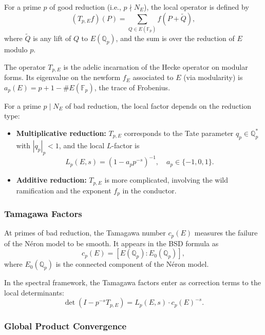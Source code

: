 \begin{definition}\label{def:local-factor-good}
For a prime $p$ of good reduction (i.e., $p \nmid N_E$), the local operator is defined by
\[
(T_{p,E} f)(P) = \sum_{Q \in E(\mathbb{F}_p)} f(P + \widetilde{Q}),
\]
where $\widetilde{Q}$ is any lift of $Q$ to $E(\mathbb{Q}_p)$, and the sum is over the reduction of $E$ modulo $p$.
\end{definition}

\begin{remark}
The operator $T_{p,E}$ is the adelic incarnation of the Hecke operator on modular forms. Its eigenvalue on the newform $f_E$ associated to $E$ (via modularity) is $a_p(E) = p + 1 - \#E(\mathbb{F}_p)$, the trace of Frobenius.
\end{remark}

\begin{definition}\label{def:local-factor-bad}
For a prime $p \mid N_E$ of bad reduction, the local factor depends on the reduction type:
\begin{itemize}
\item \textbf{Multiplicative reduction:} $T_{p,E}$ corresponds to the Tate parameter $q_p \in \mathbb{Q}_p^*$ with $|q_p|_p < 1$, and the local $L$-factor is
\[
L_p(E, s) = (1 - a_p p^{-s})^{-1}, \quad a_p \in \{-1, 0, 1\}.
\]
\item \textbf{Additive reduction:} $T_{p,E}$ is more complicated, involving the wild ramification and the exponent $f_p$ in the conductor.
\end{itemize}
\end{definition}

\subsubsection{Tamagawa Factors}

At primes of bad reduction, the Tamagawa number $c_p(E)$ measures the failure of the Néron model to be smooth. It appears in the BSD formula as
\[
c_p(E) = [E(\mathbb{Q}_p) : E_0(\mathbb{Q}_p)],
\]
where $E_0(\mathbb{Q}_p)$ is the connected component of the Néron model.

In the spectral framework, the Tamagawa factors enter as correction terms to the local determinants:
\[
\det(I - p^{-s} T_{p,E}) = L_p(E, s) \cdot c_p(E)^{-s}.
\]

\subsubsection{Global Product Convergence}

